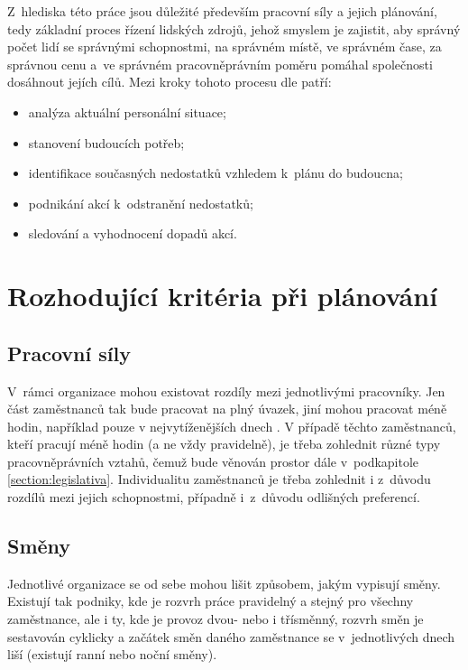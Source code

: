 \documentclass[twoside]{ctuthesis}
\begin{document}
Z~hlediska této práce jsou důležité především pracovní síly a jejich plánování, tedy základní proces řízení lidských zdrojů, jehož smyslem je zajistit, aby správný počet lidí se správnými schopnostmi, na správném místě, ve správném čase, za správnou cenu a~ve správném pracovněprávním poměru pomáhal společnosti dosáhnout jejích cílů. Mezi kroky tohoto procesu dle \cite{cipd2020workforce} patří:
\begin{itemize}
	\item analýza aktuální personální situace;
	\item stanovení budoucích potřeb;
	\item identifikace současných nedostatků vzhledem k~plánu do budoucna;
	\item podnikání akcí k~odstranění nedostatků;
	\item sledování a vyhodnocení dopadů akcí.
\end{itemize}

\section{Rozhodující kritéria při plánování}

\subsection{Pracovní síly}
V~rámci organizace mohou existovat rozdíly mezi jednotlivými pracovníky. Jen část zaměstnanců tak bude pracovat na plný úvazek, jiní mohou pracovat méně hodin, například pouze v nejvytíženějších dnech \cite{lin2015}. V případě těchto zaměstnanců, kteří pracují méně hodin (a ne vždy pravidelně), je třeba zohlednit různé typy pracovněprávních vztahů, čemuž bude věnován prostor dále v~podkapitole \ref{section:legislativa}. Individualitu zaměstnanců je třeba zohlednit i z~důvodu rozdílů mezi jejich schopnostmi, případně i~z~důvodu odlišných preferencí.

\subsection{Směny}
\label{sub:smeny}
Jednotlivé organizace se od sebe mohou lišit způsobem, jakým vypisují směny. Existují tak podniky, kde je rozvrh práce pravidelný a stejný pro všechny zaměstnance, ale i ty, kde je provoz dvou- nebo i třísměnný, rozvrh směn je sestavován cyklicky a začátek směn daného zaměstnance se v~jed\-not\-li\-vý\-ch dnech liší (existují ranní nebo noční směny).
\end{document}

